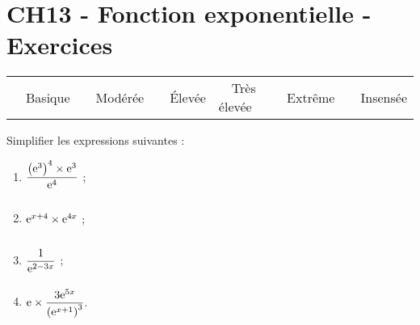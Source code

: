 \documentclass[a4paper,11pt]{article}
\author{Pierquet}
\title{\nomfichier}
\begin{document}
\pagestyle{fancy}

\part{CH13 - Fonction exponentielle - Exercices}

\medskip

\begin{caide}
	{\setlength\arrayrulewidth{1.5pt} 
		\begin{tabularx}{\linewidth}{Y|Y|Y|Y|Y|Y}
			~~\textsf{Basique} & ~~\textsf{Modérée} & ~~\textsf{Élevée} & ~~\textsf{Très élevée} & ~~\textsf{Extrême} & ~~\textsf{Insensée} \\
	\end{tabularx}}
\end{caide}


\medskip

Simplifier les expressions suivantes :
\begin{multicols}{4}
	\newcommand\espv{\dfrac{3\e^{5x}}{\left(\e^{x+1}\right)^3}}
	\begin{enumerate}
		\item $\dfrac{\left(\e^3\right)^4 \times \e^3}{\e^4}\vphantom{\espv}$ ;
		\item $\e^{x+4} \times \e^{4x}\vphantom{\espv}$ ;
		\item $\dfrac{1}{\e^{2-3x}}\vphantom{\espv}$ ;
		\item ${\rm e} \times \dfrac{3{\rm e}^{5x}}{\left({\rm e}^{x+1}\right)^3}$.
	\end{enumerate}
\end{multicols}

\medskip


\smallskip
\end{document}
